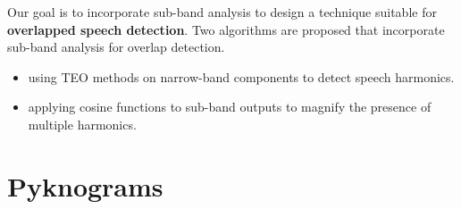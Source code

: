 Our goal is to incorporate sub-band analysis to design a technique suitable for {\bf overlapped speech detection}. 
Two algorithms are proposed that incorporate sub-band analysis for overlap detection. 
\begin{itemize}
	\item using TEO methods on narrow-band components to detect speech harmonics. 
	\item applying cosine functions to sub-band outputs to magnify the presence of multiple harmonics. 
\end{itemize}



\section{Pyknograms}
\label{sec:ovldet}

